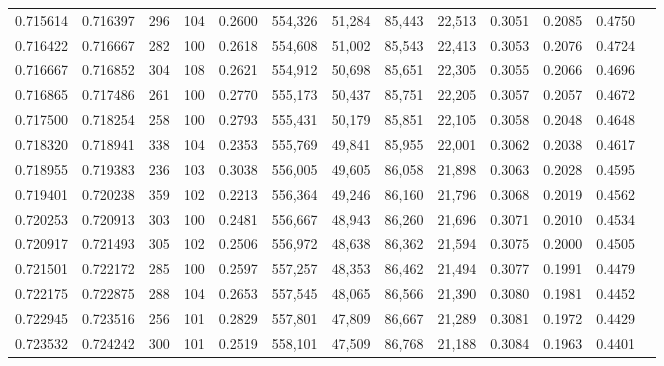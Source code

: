 \begin{tabular}{rrrrrrrrrrrrr}
0.715614 & 0.716397 &    296 &   104 &                                     0.2600 & 554,326 &  51,284 &  85,443 &  22,513 & 0.3051 & 0.2085 & 0.4750 \\
0.716422 & 0.716667 &    282 &   100 &                                     0.2618 & 554,608 &  51,002 &  85,543 &  22,413 & 0.3053 & 0.2076 & 0.4724 \\
0.716667 & 0.716852 &    304 &   108 &                                     0.2621 & 554,912 &  50,698 &  85,651 &  22,305 & 0.3055 & 0.2066 & 0.4696 \\
0.716865 & 0.717486 &    261 &   100 &                                     0.2770 & 555,173 &  50,437 &  85,751 &  22,205 & 0.3057 & 0.2057 & 0.4672 \\
0.717500 & 0.718254 &    258 &   100 &                                     0.2793 & 555,431 &  50,179 &  85,851 &  22,105 & 0.3058 & 0.2048 & 0.4648 \\
0.718320 & 0.718941 &    338 &   104 &                                     0.2353 & 555,769 &  49,841 &  85,955 &  22,001 & 0.3062 & 0.2038 & 0.4617 \\
0.718955 & 0.719383 &    236 &   103 &                                     0.3038 & 556,005 &  49,605 &  86,058 &  21,898 & 0.3063 & 0.2028 & 0.4595 \\
0.719401 & 0.720238 &    359 &   102 &                                     0.2213 & 556,364 &  49,246 &  86,160 &  21,796 & 0.3068 & 0.2019 & 0.4562 \\
0.720253 & 0.720913 &    303 &   100 &                                     0.2481 & 556,667 &  48,943 &  86,260 &  21,696 & 0.3071 & 0.2010 & 0.4534 \\
0.720917 & 0.721493 &    305 &   102 &                                     0.2506 & 556,972 &  48,638 &  86,362 &  21,594 & 0.3075 & 0.2000 & 0.4505 \\
0.721501 & 0.722172 &    285 &   100 &                                     0.2597 & 557,257 &  48,353 &  86,462 &  21,494 & 0.3077 & 0.1991 & 0.4479 \\
0.722175 & 0.722875 &    288 &   104 &                                     0.2653 & 557,545 &  48,065 &  86,566 &  21,390 & 0.3080 & 0.1981 & 0.4452 \\
0.722945 & 0.723516 &    256 &   101 &                                     0.2829 & 557,801 &  47,809 &  86,667 &  21,289 & 0.3081 & 0.1972 & 0.4429 \\
0.723532 & 0.724242 &    300 &   101 &                                     0.2519 & 558,101 &  47,509 &  86,768 &  21,188 & 0.3084 & 0.1963 & 0.4401 \\

\end{tabular}
